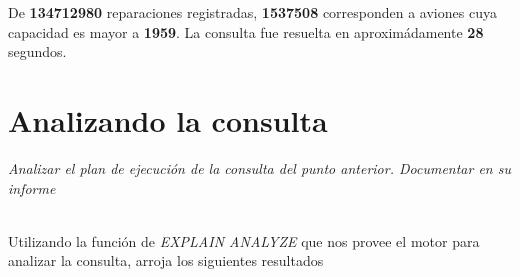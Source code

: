 De \textbf{134712980} reparaciones registradas, \textbf{1537508} corresponden a aviones cuya capacidad es mayor a \textbf{1959}. La consulta fue resuelta en aproximádamente \textbf{28} segundos.   

\section{Analizando la consulta}
\emph{Analizar el plan de ejecución de la consulta del punto anterior. Documentar en su informe} 

~\\

Utilizando la función de \emph{EXPLAIN ANALYZE} que nos provee el motor para analizar la consulta, arroja los siguientes resultados 

\vspace*{5mm}
\lstset{style=sql}
\begin{lstlisting}
\end{lstlisting}
 






\clearpage




